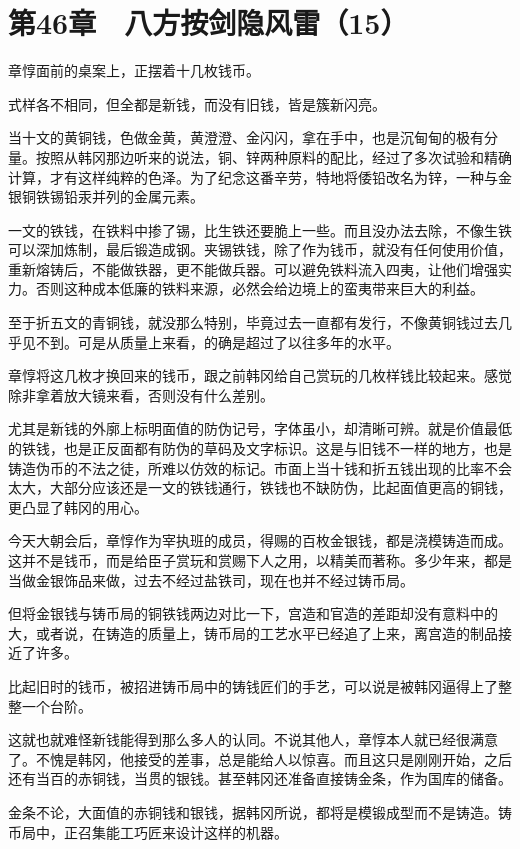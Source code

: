 \section{第46章　八方按剑隐风雷（15）}

章惇面前的桌案上，正摆着十几枚钱币。

式样各不相同，但全都是新钱，而没有旧钱，皆是簇新闪亮。

当十文的黄铜钱，色做金黄，黄澄澄、金闪闪，拿在手中，也是沉甸甸的极有分量。按照从韩冈那边听来的说法，铜、锌两种原料的配比，经过了多次试验和精确计算，才有这样纯粹的色泽。为了纪念这番辛劳，特地将倭铅改名为锌，一种与金银铜铁锡铅汞并列的金属元素。

一文的铁钱，在铁料中掺了锡，比生铁还要脆上一些。而且没办法去除，不像生铁可以深加炼制，最后锻造成钢。夹锡铁钱，除了作为钱币，就没有任何使用价值，重新熔铸后，不能做铁器，更不能做兵器。可以避免铁料流入四夷，让他们增强实力。否则这种成本低廉的铁料来源，必然会给边境上的蛮夷带来巨大的利益。

至于折五文的青铜钱，就没那么特别，毕竟过去一直都有发行，不像黄铜钱过去几乎见不到。可是从质量上来看，的确是超过了以往多年的水平。

章惇将这几枚才换回来的钱币，跟之前韩冈给自己赏玩的几枚样钱比较起来。感觉除非拿着放大镜来看，否则没有什么差别。

尤其是新钱的外廓上标明面值的防伪记号，字体虽小，却清晰可辨。就是价值最低的铁钱，也是正反面都有防伪的草码及文字标识。这是与旧钱不一样的地方，也是铸造伪币的不法之徒，所难以仿效的标记。市面上当十钱和折五钱出现的比率不会太大，大部分应该还是一文的铁钱通行，铁钱也不缺防伪，比起面值更高的铜钱，更凸显了韩冈的用心。

今天大朝会后，章惇作为宰执班的成员，得赐的百枚金银钱，都是浇模铸造而成。这并不是钱币，而是给臣子赏玩和赏赐下人之用，以精美而著称。多少年来，都是当做金银饰品来做，过去不经过盐铁司，现在也并不经过铸币局。

但将金银钱与铸币局的铜铁钱两边对比一下，宫造和官造的差距却没有意料中的大，或者说，在铸造的质量上，铸币局的工艺水平已经追了上来，离宫造的制品接近了许多。

比起旧时的钱币，被招进铸币局中的铸钱匠们的手艺，可以说是被韩冈逼得上了整整一个台阶。

这就也就难怪新钱能得到那么多人的认同。不说其他人，章惇本人就已经很满意了。不愧是韩冈，他接受的差事，总是能给人以惊喜。而且这只是刚刚开始，之后还有当百的赤铜钱，当贯的银钱。甚至韩冈还准备直接铸金条，作为国库的储备。

金条不论，大面值的赤铜钱和银钱，据韩冈所说，都将是模锻成型而不是铸造。铸币局中，正召集能工巧匠来设计这样的机器。

